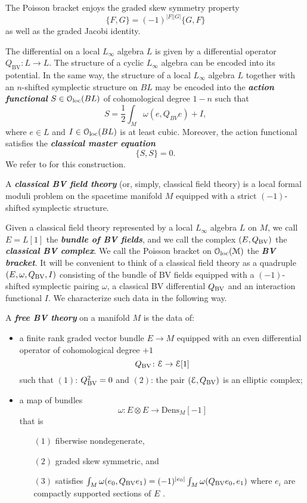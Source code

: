\documentclass[10pt, oneside]{article}
\newcommand{\Dens}{\mathrm{Dens}}
\newcommand{\defterm}[1]{\textbf{\emph{#1}}}
\begin{document}
The Poisson bracket enjoys the graded skew symmetry property
\[
\{F, G\} = (-1)^{|F| |G|} \{G, F\}
\]
as well as the graded Jacobi identity.

The differential on a local $L_\infty$ algebra $L$ is given by a differential operator $Q_{\mathrm{BV}}\colon L\rightarrow L$. The structure of a cyclic $L_\infty$ algebra can be encoded into its potential. In the same way, the structure of a local $L_\infty$ algebra $L$ together with an $n$-shifted symplectic structure on $BL$ may be encoded into the \defterm{action functional} $S\in\mathcal{O}_{\rm loc}(BL)$ of cohomological degree $1-n$ such that
\[S = \frac{1}{2}\int_M\omega(e, Q_{BV} e) + I,\]
where $e\in L$ and $I\in\mathcal{O}_{\rm loc}(BL)$ is at least cubic. Moreover, the action functional satisfies the \defterm{classical master equation}
\[\{S, S\} = 0.\]
We refer to \cite[Proposition 5.4.0.2]{Book2} for this construction.

\begin{definition}
A \defterm{classical BV field theory} (or, simply, classical field theory) is a local formal moduli problem on the spacetime manifold $M$ equipped with a strict $(-1)$-shifted symplectic structure.
\label{def:classicalfieldtheory}
\end{definition}

Given a classical field theory represented by a local $L_\infty$ algebra $L$ on $M$, we call $E=L[1]$ the \defterm{bundle of BV fields}, and we call the complex $(E, Q_{\mathrm{BV}})$ the \defterm{classical BV complex}. We call the Poisson bracket on $\mathcal{O}_{\rm loc}(\mathcal M)$ the \defterm{BV bracket}. It will be convenient to think of a classical field theory as a quadruple $(E, \omega, Q_{\mathrm{BV}}, I)$ consisting of the bundle of BV fields equipped with a $(-1)$-shifted symplectic pairing $\omega$, a classical BV differential $Q_{\mathrm{BV}}$ and an interaction functional $I$.  We characterize such data in the following way.

\begin{definition}
A \defterm{free BV theory} on a manifold $M$ is the data of:
\begin{itemize}
\item a finite rank graded vector bundle $E \to M$ equipped with an even differential operator of cohomological degree $+1$
\[
Q_{\mathrm{BV}} \colon \mathcal E \to \mathcal E [1] 
\]
such that $(1)$: $Q_{\mathrm{BV}}^2 = 0$ and $(2)$: the pair $(\mathcal E , Q_{\mathrm{BV}})$ is an elliptic complex;
\item a map of bundles
\[
\omega\colon E \otimes E \to \Dens_M [-1]
\]
that is
\begin{enumerate}
\item[$(1)$] fiberwise nondegenerate,
\item[$(2)$] graded skew symmetric, and
\item[$(3)$] satisfies $\int_M \omega(e_0, Q_{\mathrm{BV}} e_1) = (-1)^{|e_0|} \int_M \omega(Q_{\mathrm{BV}} e_0, e_1)$ where $e_i$ are compactly supported sections of $E$ .
\end{enumerate}
\end{itemize}
\end{definition}
\end{document}

